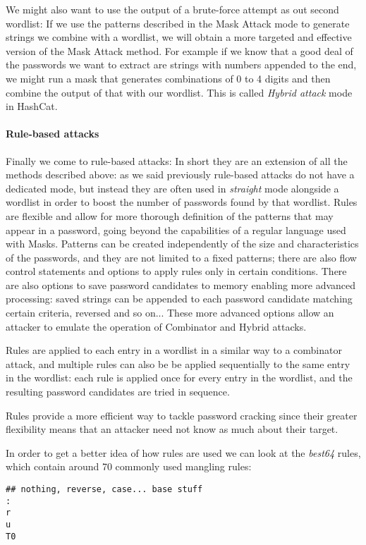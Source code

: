 We might also want to use the output of a brute-force attempt as out second wordlist: If we use the patterns described in the Mask Attack mode to generate strings we combine with a wordlist, we will obtain a more targeted and effective version of the Mask Attack method. 
For example if we know that a good deal of the passwords we want to extract are strings with numbers appended to the end, we might run a mask that generates combinations of 0 to 4 digits and then combine the output of that with our wordlist. This is called \emph{Hybrid attack} mode in HashCat.

\paragraph{Rule-based attacks}
Finally we come to rule-based attacks: In short they are an extension of all the methods described above: as we said previously rule-based attacks do not have a dedicated mode, but instead they are often used in \emph{straight} mode alongside a wordlist in order to boost the number of passwords found by that wordlist.
Rules are flexible and allow for more thorough definition of the patterns that may appear in a password, going beyond the capabilities of a regular language used with Masks.
Patterns can be created independently of the size and characteristics of the passwords, and they are not limited to a fixed patterns; there are also flow control statements and options to apply rules only in certain conditions.
There are also options to save password candidates to memory enabling more advanced processing: saved strings can be appended to each password candidate matching certain criteria, reversed and so on...
These more advanced options allow an attacker to emulate the operation of Combinator and Hybrid attacks. 

Rules are applied to each entry in a wordlist in a similar way to a combinator attack, and multiple rules can also be be applied sequentially to the same entry in the wordlist: each rule is applied once for every entry in the wordlist, and the resulting password candidates are tried in sequence.

Rules provide a more efficient way to tackle password cracking since their greater flexibility means that an attacker need not know as much about their target. 

In order to get a better idea of how rules are used we can look at the \emph{best64} rules, which contain around 70 commonly used mangling rules:
\begin{verbatim}
## nothing, reverse, case... base stuff
:
r
u
T0
\end{verbatim}

